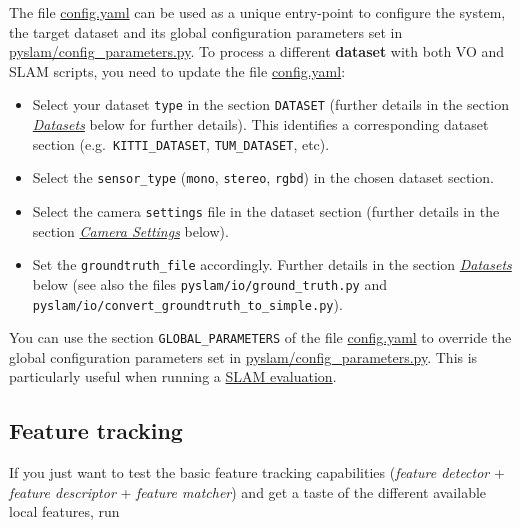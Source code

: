 \documentclass{article}
\begin{document}
The file \href{https://github.com/luigifreda/pyslam/blob/master/config.yaml}{config.yaml} can be used as a unique
entry-point to configure the system, the target dataset and its global
configuration parameters set in
\href{https://github.com/luigifreda/pyslam/blob/master/pyslam/config_parameters.py}{pyslam/config\_parameters.py}.
To process a different \textbf{dataset} with both VO and SLAM scripts,
you need to update the file \href{https://github.com/luigifreda/pyslam/blob/master/config.yaml}{config.yaml}:
\begin{itemize}
\item Select
your dataset \texttt{type} in the section \texttt{DATASET} (further
details in the section \emph{\protect\hyperlink{datasets}{Datasets}}
below for further details). This identifies a corresponding dataset
section (e.g.~\texttt{KITTI\_DATASET}, \texttt{TUM\_DATASET}, etc). 
\item  Select the \texttt{sensor\_type} (\texttt{mono}, \texttt{stereo},
\texttt{rgbd}) in the chosen dataset section.
\item  Select the camera \texttt{settings} file in the dataset section
(further details in the section
\emph{\protect\hyperlink{camera-settings}{Camera Settings}} below).
\item Set the \texttt{groundtruth\_file} accordingly. Further details in the
section \emph{\protect\hyperlink{datasets}{Datasets}} below (see also
the files \texttt{pyslam/io/ground\_truth.py} and
\texttt{pyslam/io/convert\_groundtruth\_to\_simple.py}).
\end{itemize}

You can use the section \texttt{GLOBAL\_PARAMETERS} of the file
\href{https://github.com/luigifreda/pyslam/blob/master/config.yaml}{config.yaml} to override the global configuration
parameters set in \href{https://github.com/luigifreda/pyslam/blob/master/pyslam/config_parameters.py}{pyslam/config\_parameters.py}.
This is particularly useful when running a
\protect\hyperlink{evaluating-slam}{SLAM evaluation}.

\hypertarget{feature-tracking}{%
\subsection{Feature tracking}\label{feature-tracking}}

If you just want to test the basic feature tracking capabilities
(\emph{feature detector} + \emph{feature descriptor} + \emph{feature
matcher}) and get a taste of the different available local features, run \\
\end{document}
